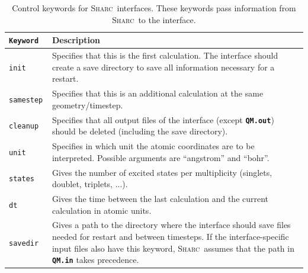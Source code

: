 \documentclass[a4paper,11pt,DIV=15,openany,twoside=false]{scrbook}
\newcommand{\sharc}{\textsc{Sharc}}
\newcommand{\ttt}[1]{\textbf{\texttt{#1}}}
\begin{document}
\begin{table}
  \centering
  \caption{Control keywords for \sharc\ interfaces. These keywords pass information from \sharc\ to the interface.}
  \label{tab:int_ctrl}
  \begin{tabular}{>{\tt}lp{12cm}}
  \toprule
  Keyword       &Description\\
  \midrule
  init            &Specifies that this is the first calculation. The interface should create a save directory to save all information necessary for a restart. \\
  samestep        &Specifies that this is an additional calculation at the same geometry/timestep. \\
  cleanup         &Specifies that all output files of the interface (except \ttt{QM.out}) should be deleted (including the save directory).\\
  unit            &Specifies in which unit the atomic coordinates are to be interpreted. Possible arguments are ``angstrom'' and ``bohr''.\\
  states          &Gives the number of excited states per multiplicity (singlets, doublet, triplets, ...).\\
  dt              &Gives the time between the last calculation and the current calculation in atomic units.\\
  savedir         &Gives a path to the directory where the interface should save files needed for restart and between timesteps. If the interface-specific input files also have this keyword, \sharc\ assumes that the path in \ttt{QM.in} takes precedence.\\
  \bottomrule
  \end{tabular}
\end{table}
\end{document}
